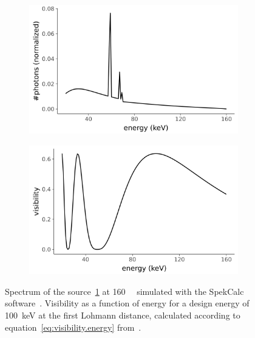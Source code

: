 \begin{figure}[htb]
    \centering
    \begin{subfigure}[b]{.49\textwidth}
    \centering
    \includegraphics[width=\textwidth]{gfx/spectrum-visibility/spectrum.png}
    \caption{}
    \label{fig:spectrum}
    \end{subfigure}
    \hfill
    \begin{subfigure}[b]{.49\textwidth}
    \centering
    \includegraphics[width=\textwidth]{gfx/spectrum-visibility/visibility.png}
    \caption{}
    \label{fig:visibility}
    \end{subfigure}
    \caption[Spectrum and theoretical visibility of the \SI{100}{\kilo\eV}
    interferometer.]{Spectrum of the source~\ref{fig:spectrum} at \SI{160}{\kilo\voltpeak}
simulated with the SpekCalc software~\cite{spekcalc}. Visibility as a
function of energy for a design energy of \SI{100}{\kilo\eV} at the first
Lohmann distance, calculated according to
equation~\ref{eq:visibility.energy} from~\cite{Thuering20130027}.}
    \label{fig:visibility.energy}
\end{figure}

